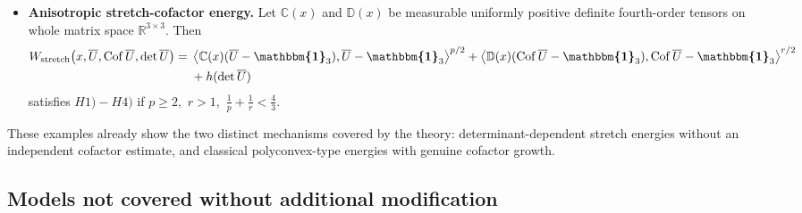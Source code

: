 \documentclass[11pt]{article}
\newcommand{\id}{{\boldsymbol{\mathbbm{1}}}}
\DeclareMathOperator{\Cof}{Cof}
\begin{document}
\begin{itemize}
\item \textbf{Anisotropic stretch-cofactor energy.}
Let $\mathbb C(x)$ and $\mathbb D(x)$ be measurable uniformly positive
definite fourth-order tensors on whole matrix space  $\mathbb R^{3\times 3}$. Then
\begin{align}
\begin{aligned}
        W_{\rm stretch}\bigl(x,\overline U,\Cof \overline U,\det \overline U\bigr)
        ={}&
        \left\langle
        \mathbb C(x)(\overline U-\id_3),\overline U-\id_3
        \right\rangle^{p/2}
       +
        \left\langle
        \mathbb D(x)(\Cof \overline U-\id_3),\Cof \overline U-\id_3
        \right\rangle^{r/2}\notag
        \\&+
        h(\det \overline U)
\end{aligned}
\end{align}
satisfies $H1)-H4)$ if
$
        p\geq2,
             $ $
        r>1,
           $ $
        \frac1p+\frac1r<\frac43.
$

\end{itemize}

These  examples already show the two distinct mechanisms covered by the theory: determinant-dependent stretch energies without an independent cofactor estimate, and classical polyconvex-type energies with genuine cofactor growth.


\subsection{Models not covered without additional modification}
\end{document}
